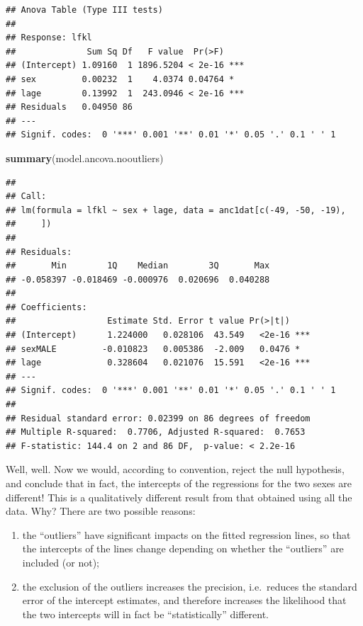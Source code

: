\documentclass[
  12pt,
]{book}
\newenvironment{Shaded}{\begin{snugshade}}{\end{snugshade}}
\newcommand{\KeywordTok}[1]{\textcolor[rgb]{0.13,0.29,0.53}{\textbf{#1}}}
\newcommand{\NormalTok}[1]{#1}
\providecommand{\tightlist}{%
  \setlength{\itemsep}{0pt}\setlength{\parskip}{0pt}}
\begin{document}
\begin{verbatim}
## Anova Table (Type III tests)
## 
## Response: lfkl
##              Sum Sq Df   F value  Pr(>F)    
## (Intercept) 1.09160  1 1896.5204 < 2e-16 ***
## sex         0.00232  1    4.0374 0.04764 *  
## lage        0.13992  1  243.0946 < 2e-16 ***
## Residuals   0.04950 86                      
## ---
## Signif. codes:  0 '***' 0.001 '**' 0.01 '*' 0.05 '.' 0.1 ' ' 1
\end{verbatim}

\begin{Shaded}
\begin{Highlighting}[]
\KeywordTok{summary}\NormalTok{(model.ancova.nooutliers)}
\end{Highlighting}
\end{Shaded}

\begin{verbatim}
## 
## Call:
## lm(formula = lfkl ~ sex + lage, data = anc1dat[c(-49, -50, -19), 
##     ])
## 
## Residuals:
##       Min        1Q    Median        3Q       Max 
## -0.058397 -0.018469 -0.000976  0.020696  0.040288 
## 
## Coefficients:
##                  Estimate Std. Error t value Pr(>|t|)    
## (Intercept)      1.224000   0.028106  43.549   <2e-16 ***
## sexMALE         -0.010823   0.005386  -2.009   0.0476 *  
## lage             0.328604   0.021076  15.591   <2e-16 ***
## ---
## Signif. codes:  0 '***' 0.001 '**' 0.01 '*' 0.05 '.' 0.1 ' ' 1
## 
## Residual standard error: 0.02399 on 86 degrees of freedom
## Multiple R-squared:  0.7706, Adjusted R-squared:  0.7653 
## F-statistic: 144.4 on 2 and 86 DF,  p-value: < 2.2e-16
\end{verbatim}

Well, well. Now we would, according to convention, reject the null hypothesis, and conclude that in fact, the intercepts of the regressions for the two sexes are different! This is a qualitatively different result from that obtained using all the data. Why? There are two possible reasons:

\begin{enumerate}
\def\labelenumi{\arabic{enumi}.}
\tightlist
\item
  the ``outliers'' have significant impacts on the fitted regression lines, so that the intercepts of the lines change depending on whether the ``outliers'' are included (or not);
\item
  the exclusion of the outliers increases the precision, i.e.~reduces the standard error of the intercept estimates, and therefore increases the likelihood that the two intercepts will in fact be ``statistically'' different.
\end{enumerate}
\end{document}
